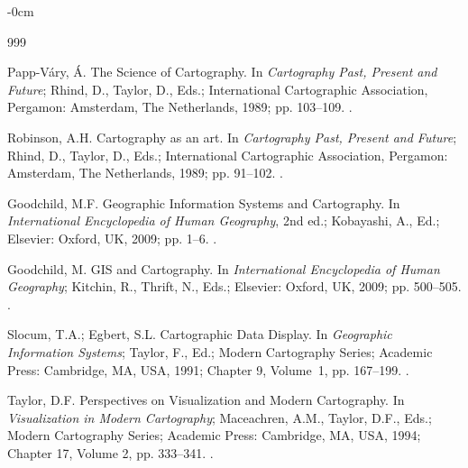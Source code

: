 \documentclass[geomatics,article,accept,pdftex,moreauthors]{Definitions/mdpi}
\begin{document}
\begin{adjustwidth}{-\extralength}{0cm}


%
\begin{thebibliography}{999}

Papp-Váry, Á.
\newblock The Science of Cartography. In {\em Cartography Past, Present and
  Future}; Rhind, D., Taylor, D., Eds.; International Cartographic Association,
  Pergamon: Amsterdam,  The Netherlands, 1989; pp. 103--109.
.

Robinson, A.H.
\newblock Cartography as an art. In {\em Cartography Past, Present and Future};
  Rhind, D., Taylor, D., Eds.; International Cartographic Association,
  Pergamon: Amsterdam,  The Netherlands, 1989; pp. 91--102.
.

Goodchild, M.F.
\newblock Geographic Information Systems and Cartography. In {\em International
  Encyclopedia of Human Geography}, 2nd ed.;
  Kobayashi, A., Ed.; Elsevier: Oxford,  UK, 2009; pp. 1--6.
.

Goodchild, M.
\newblock GIS and Cartography. In {\em International Encyclopedia of Human
  Geography}; Kitchin, R., Thrift, N., Eds.; Elsevier: Oxford,  UK, 2009; pp.
  500--505.
.

Slocum, T.A.; Egbert, S.L.
\newblock Cartographic Data Display. In {\em Geographic Information
  Systems}; Taylor, F., Ed.; Modern
  Cartography Series; Academic Press: Cambridge, MA, USA, %
1991; Chapter 9, Volume~1, pp. 167--199.
.

Taylor, D.F.
\newblock Perspectives on Visualization and Modern Cartography. In
  {\em Visualization in Modern Cartography}; Maceachren, A.M., Taylor, D.F.,
  Eds.; Modern Cartography Series; Academic Press:  Cambridge, MA, USA, 1994; Chapter 17, Volume 2, pp. 333--341.
. %


\end{thebibliography}
\end{adjustwidth}
\end{document}
